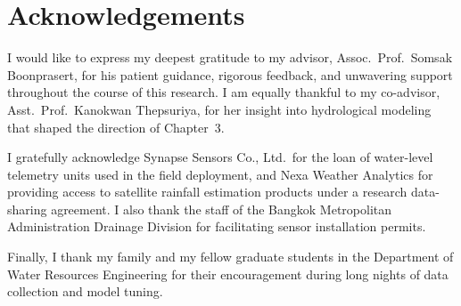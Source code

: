 \chapter*{Acknowledgements}

\noindent
I would like to express my deepest gratitude to my advisor, Assoc.\ Prof.\ Somsak Boonprasert, for his patient guidance, rigorous feedback, and unwavering support throughout the course of this research. I am equally thankful to my co-advisor, Asst.\ Prof.\ Kanokwan Thepsuriya, for her insight into hydrological modeling that shaped the direction of Chapter~3.

\noindent
I gratefully acknowledge Synapse Sensors Co., Ltd.\ for the loan of water-level telemetry units used in the field deployment, and Nexa Weather Analytics for providing access to satellite rainfall estimation products under a research data-sharing agreement. I also thank the staff of the Bangkok Metropolitan Administration Drainage Division for facilitating sensor installation permits.

\noindent
Finally, I thank my family and my fellow graduate students in the Department of Water Resources Engineering for their encouragement during long nights of data collection and model tuning.

\tableofcontents
\listoftables
\listoffigures
